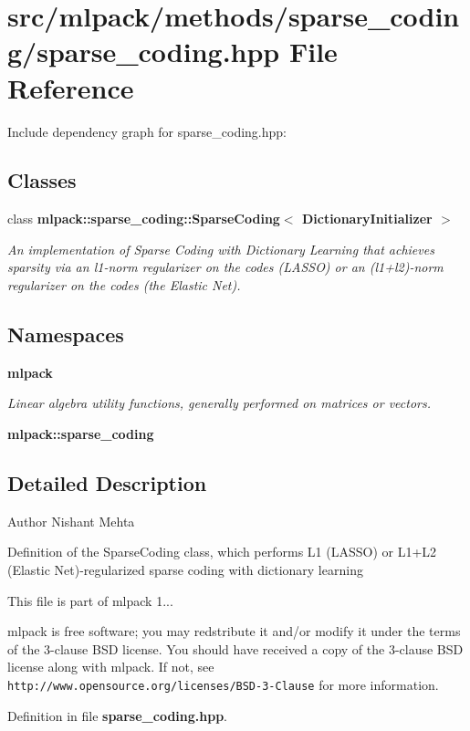 \section{src/mlpack/methods/sparse\-\_\-coding/sparse\-\_\-coding.hpp File Reference}
\label{sparse__coding_8hpp}
Include dependency graph for sparse\-\_\-coding.\-hpp\-:
\subsection*{Classes}
\begin{DoxyCompactItemize}
\item 
class {\bf mlpack\-::sparse\-\_\-coding\-::\-Sparse\-Coding$<$ Dictionary\-Initializer $>$}
\begin{DoxyCompactList}\small\item\em An implementation of Sparse Coding with Dictionary Learning that achieves sparsity via an l1-\/norm regularizer on the codes (L\-A\-S\-S\-O) or an (l1+l2)-\/norm regularizer on the codes (the Elastic Net). \end{DoxyCompactList}\end{DoxyCompactItemize}
\subsection*{Namespaces}
\begin{DoxyCompactItemize}
\item 
{\bf mlpack}
\begin{DoxyCompactList}\small\item\em Linear algebra utility functions, generally performed on matrices or vectors. \end{DoxyCompactList}\item 
{\bf mlpack\-::sparse\-\_\-coding}
\end{DoxyCompactItemize}


\subsection{Detailed Description}
\begin{DoxyAuthor}{Author}
Nishant Mehta
\end{DoxyAuthor}
Definition of the Sparse\-Coding class, which performs L1 (L\-A\-S\-S\-O) or L1+\-L2 (Elastic Net)-\/regularized sparse coding with dictionary learning

This file is part of mlpack 1...

mlpack is free software; you may redstribute it and/or modify it under the terms of the 3-\/clause B\-S\-D license. You should have received a copy of the 3-\/clause B\-S\-D license along with mlpack. If not, see {\tt http\-://www.\-opensource.\-org/licenses/\-B\-S\-D-\/3-\/\-Clause} for more information. 

Definition in file {\bf sparse\-\_\-coding.\-hpp}.

